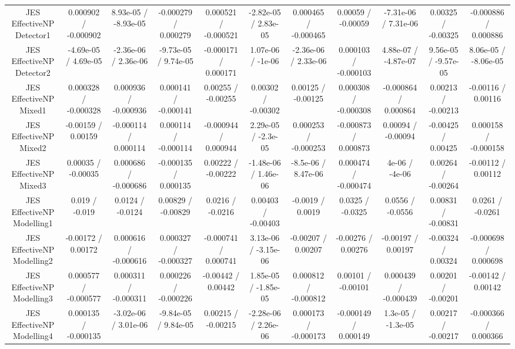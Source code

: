 \begin{table}[htbp]
\begin{center}
\begin{tabular}{|c|c|c|c|c|c|c|c|c|c|c|}
  JES EffectiveNP Detector1 & 0.000902 / -0.000902 & 8.93e-05 / -8.93e-05 & -0.000279 / 0.000279 & 0.000521 / -0.000521 & -2.82e-05 / 2.83e-05 & 0.000465 / -0.000465 & 0.00059 / -0.00059 & -7.31e-06 / 7.31e-06 & 0.00325 / -0.00325 & -0.000886 / 0.000886 \\ 
  JES EffectiveNP Detector2 & -4.69e-05 / 4.69e-05 & -2.36e-06 / 2.36e-06 & -9.73e-05 / 9.74e-05 & -0.000171 / 0.000171 & 1.07e-06 / -1e-06 & -2.36e-06 / 2.33e-06 & 0.000103 / -0.000103 & 4.88e-07 / -4.87e-07 & 9.56e-05 / -9.57e-05 & 8.06e-05 / -8.06e-05 \\ 
  JES EffectiveNP Mixed1 & 0.000328 / -0.000328 & 0.000936 / -0.000936 & 0.000141 / -0.000141 & 0.00255 / -0.00255 & 0.00302 / -0.00302 & 0.00125 / -0.00125 & 0.000308 / -0.000308 & -0.000864 / 0.000864 & 0.00213 / -0.00213 & -0.00116 / 0.00116 \\ 
  JES EffectiveNP Mixed2 & -0.00159 / 0.00159 & -0.000114 / 0.000114 & 0.000114 / -0.000114 & -0.000944 / 0.000944 & 2.29e-05 / -2.3e-05 & 0.000253 / -0.000253 & -0.000873 / 0.000873 & 0.00094 / -0.00094 & -0.00425 / 0.00425 & 0.000158 / -0.000158 \\ 
  JES EffectiveNP Mixed3 & 0.00035 / -0.00035 & 0.000686 / -0.000686 & -0.000135 / 0.000135 & 0.00222 / -0.00222 & -1.48e-06 / 1.46e-06 & -8.5e-06 / 8.47e-06 & 0.000474 / -0.000474 & 4e-06 / -4e-06 & 0.00264 / -0.00264 & -0.00112 / 0.00112 \\ 
  JES EffectiveNP Modelling1 & 0.019 / -0.019 & 0.0124 / -0.0124 & 0.00829 / -0.00829 & 0.0216 / -0.0216 & 0.00403 / -0.00403 & -0.0019 / 0.0019 & 0.0325 / -0.0325 & 0.0556 / -0.0556 & 0.00831 / -0.00831 & 0.0261 / -0.0261 \\ 
  JES EffectiveNP Modelling2 & -0.00172 / 0.00172 & 0.000616 / -0.000616 & 0.000327 / -0.000327 & -0.000741 / 0.000741 & 3.13e-06 / -3.15e-06 & -0.00207 / 0.00207 & -0.00276 / 0.00276 & -0.00197 / 0.00197 & -0.00324 / 0.00324 & -0.000698 / 0.000698 \\ 
  JES EffectiveNP Modelling3 & 0.000577 / -0.000577 & 0.000311 / -0.000311 & 0.000226 / -0.000226 & -0.00442 / 0.00442 & 1.85e-05 / -1.85e-05 & 0.000812 / -0.000812 & 0.00101 / -0.00101 & 0.000439 / -0.000439 & 0.00201 / -0.00201 & -0.00142 / 0.00142 \\ 
  JES EffectiveNP Modelling4 & 0.000135 / -0.000135 & -3.02e-06 / 3.01e-06 & -9.84e-05 / 9.84e-05 & 0.00215 / -0.00215 & -2.28e-06 / 2.26e-06 & 0.000173 / -0.000173 & -0.000149 / 0.000149 & 1.3e-05 / -1.3e-05 & 0.00217 / -0.00217 & -0.000366 / 0.000366 \\ 

\end{tabular}
\end{center}
\end{table}
